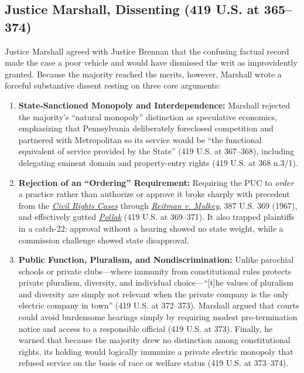 \documentclass[12pt]{article}
\begin{document}
\subsection{Justice Marshall, Dissenting (419 U.S. at 365--374)}
Justice Marshall agreed with Justice Brennan that the confusing factual record made the case a poor vehicle and would have dismissed the writ as improvidently granted. Because the majority reached the merits, however, Marshall wrote a forceful substantive dissent resting on three core arguments:
\begin{enumerate}
  \item \textbf{State-Sanctioned Monopoly and Interdependence:} Marshall rejected the majority's ``natural monopoly'' distinction as speculative economics, emphasizing that Pennsylvania deliberately foreclosed competition and partnered with Metropolitan so its service would be ``the functional equivalent of service provided by the State'' (419 U.S. at 367--368), including delegating eminent domain and property-entry rights (419 U.S. at 368 n.3/1).
  \item \textbf{Rejection of an ``Ordering'' Requirement:} Requiring the PUC to \emph{order} a practice rather than authorize or approve it broke sharply with precedent from the \href{https://supreme.justia.com/cases/federal/us/109/3/}{\emph{Civil Rights Cases}} through \href{https://supreme.justia.com/cases/federal/us/387/369/}{\emph{Reitman v. Mulkey}}, 387 U.S. 369 (1967), and effectively gutted \href{https://supreme.justia.com/cases/federal/us/343/451/}{\emph{Pollak}} (419 U.S. at 369--371). It also trapped plaintiffs in a catch-22: approval without a hearing showed no state weight, while a commission challenge showed state disapproval.
  \item \textbf{Public Function, Pluralism, and Nondiscrimination:} Unlike parochial schools or private clubs---where immunity from constitutional rules protects private pluralism, diversity, and individual choice---``[t]he values of pluralism and diversity are simply not relevant when the private company is the only electric company in town'' (419 U.S. at 372--373). Marshall argued that courts could avoid burdensome hearings simply by requiring modest pre-termination notice and access to a responsible official (419 U.S. at 373). Finally, he warned that because the majority drew no distinction among constitutional rights, its holding would logically immunize a private electric monopoly that refused service on the basis of race or welfare status (419 U.S. at 373--374).
\end{enumerate}
\end{document}
